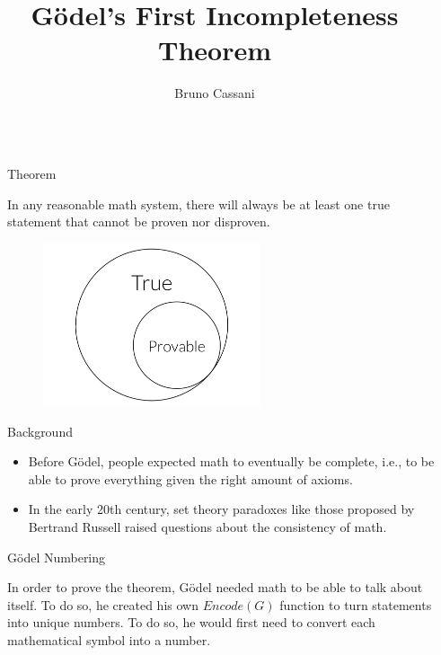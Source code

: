 \documentclass[final]{beamer} %
\title{Gödel's First Incompleteness Theorem}
\author{Bruno Cassani}
\institute[shortinst]{\textbf{Morrissey College of Arts and Sciences}, Boston College}
\newlength{\sepwidth}
\newlength{\colwidth}
\newcommand{\separatorcolumn}{\begin{column}{\sepwidth}\end{column}}
\begin{document}
\begin{frame}[t]
\begin{columns}[t]
\separatorcolumn

\begin{column}{\colwidth}



  \begin{alertblock}{Theorem}

    In any reasonable math system, there will always be at least one true statement that cannot be proven nor disproven.

    \begin{figure}
      \centering
            \includegraphics[width=0.6\textwidth]{figures/Draw_1.png} %
    \end{figure}

  \end{alertblock}
  
\begin{block}{Background}

    \begin{itemize}
      \item Before Gödel, people expected math to eventually be complete, i.e., to be able to prove everything given the right amount of axioms.
      \item In the early 20th century, set theory paradoxes like those proposed by Bertrand Russell raised questions about the consistency of math.
        
    \end{itemize}

  \end{block}

\begin{block}{Gödel Numbering}

      In order to prove the theorem, Gödel needed math to be able to talk about itself. To do so, he created his own $Encode(G)$ function to turn statements into unique numbers. To do so, he would first need to convert each mathematical symbol into a number.


\end{block}
\end{column}
\end{columns}
\end{frame}
\end{document}
